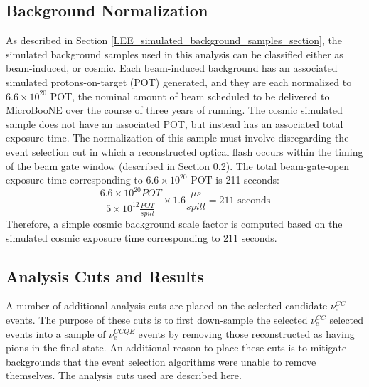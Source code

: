 \subsection{Background Normalization}\label{LEE_background_normalization_section}
As described in Section \ref{LEE_simulated_background_samples_section}, the simulated background samples used in this analysis can be classified either as beam-induced, or cosmic. Each beam-induced background has an associated simulated protons-on-target (POT) generated, and they are each normalized to $6.6\times10^{20}$ POT, the nominal amount of beam scheduled to be delivered to MicroBooNE over the course of three years of running. The cosmic simulated sample does not have an associated POT, but instead has an associated total exposure time. The normalization of this sample must involve disregarding the event selection cut in which a reconstructed optical flash occurs within the timing of the beam gate window (described in Section \ref{analysis_cut_descript_section}). The total beam-gate-open exposure time corresponding to $6.6\times10^{20}$ POT is 211 seconds:
\begin{equation}
\frac{6.6\times10^{20} POT}{5 \times 10^{12} \frac{POT}{spill}} \times 1.6\frac{\mu s}{spill} = 211 \text{ seconds}
\end{equation}
Therefore, a simple cosmic background scale factor is computed based on the simulated cosmic exposure time corresponding to 211 seconds.%


\subsection{Analysis Cuts and Results}\label{analysis_cut_descript_section}


A number of additional analysis cuts are placed on the selected candidate $\nu_e^{CC}$ events. The purpose of these cuts is to first down-sample the selected $\nu_e^{CC}$ selected events into a sample of $\nu_e^{CCQE}$ events by removing those reconstructed as having pions in the final state. An additional reason to place these cuts is to mitigate backgrounds that the event selection algorithms were unable to remove themselves. The analysis cuts used are described here.\\

